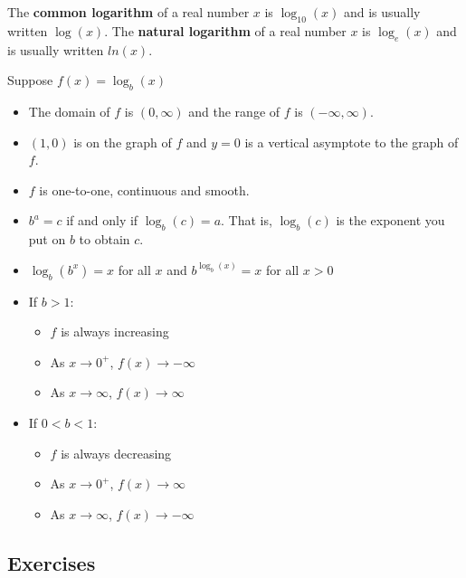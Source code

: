 \begin{definition}
    The \textbf{common logarithm} of a real number $x$ is $\log_{10}(x)$ and is usually written $\log(x)$. The \textbf{natural logarithm} of a real number $x$ is $\log_{e}(x)$ and is usually written $ln(x)$.
\end{definition}

\begin{theorem}
    Suppose $f(x)=\log_{b}(x)$
    \begin{itemize}
        \item The domain of $f$ is $(0, \infty)$ and the range of $f$ is $(-\infty, \infty)$.
        \item $(1, 0)$ is on the graph of $f$ and $y=0$ is a vertical asymptote to the graph of $f$.
        \item $f$ is one-to-one, continuous and smooth.
        \item $b^a = c$ if and only if $\log_{b}(c)=a$. That is, $\log_{b}(c)$ is the exponent you put on $b$ to obtain $c$.
        \item $\log_{b}(b^x)=x$ for all $x$ and $b^{\log_{b}(x)}=x$ for all $x>0$
        \item If $b > 1$:
              \begin{itemize}[label=-]
                  \item $f$ is always increasing
                  \item As $x \to 0^+$, $f(x) \to -\infty$
                  \item As $x \to \infty$, $f(x) \to \infty$
              \end{itemize}
        \item If $0 < b < 1$:
              \begin{itemize}[label=-]
                  \item $f$ is always decreasing
                  \item As $x \to 0^+$, $f(x) \to \infty$
                  \item As $x \to \infty$, $f(x) \to -\infty$
              \end{itemize}
    \end{itemize}
\end{theorem}


\subsection{Exercises}
